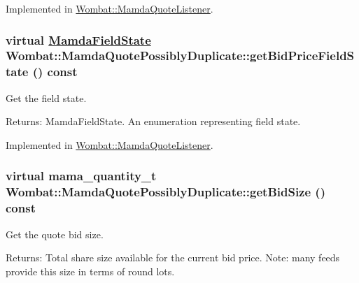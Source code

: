 Implemented in \hyperlink{classWombat_1_1MamdaQuoteListener_af4b7f010c56303476dc4de64fa0b3f4}{Wombat::Mamda\-Quote\-Listener}.\hypertarget{classWombat_1_1MamdaQuotePossiblyDuplicate_a6a72244b3f12d0c8d1a0c14a7305764}{
\subsubsection[getBidPriceFieldState]{\setlength{\rightskip}{0pt plus 5cm}virtual \hyperlink{namespaceWombat_93aac974f2ab713554fd12a1fa3b7d2a}{Mamda\-Field\-State} Wombat::Mamda\-Quote\-Possibly\-Duplicate::get\-Bid\-Price\-Field\-State () const}}
\label{classWombat_1_1MamdaQuotePossiblyDuplicate_a6a72244b3f12d0c8d1a0c14a7305764}


Get the field state. 

\begin{Desc}
\item[Returns:]Mamda\-Field\-State. An enumeration representing field state. \end{Desc}


Implemented in \hyperlink{classWombat_1_1MamdaQuoteListener_edb910c741c98a43134d0abcb325079e}{Wombat::Mamda\-Quote\-Listener}.\hypertarget{classWombat_1_1MamdaQuotePossiblyDuplicate_40310d566fe0070d4bffa77365a98108}{
\subsubsection[getBidSize]{\setlength{\rightskip}{0pt plus 5cm}virtual mama\_\-quantity\_\-t Wombat::Mamda\-Quote\-Possibly\-Duplicate::get\-Bid\-Size () const}}
\label{classWombat_1_1MamdaQuotePossiblyDuplicate_40310d566fe0070d4bffa77365a98108}


Get the quote bid size. 

\begin{Desc}
\item[Returns:]Total share size available for the current bid price. Note: many feeds provide this size in terms of round lots. \end{Desc}



